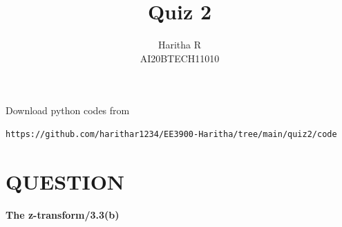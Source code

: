 \documentclass[journal,12pt,twocolumn]{IEEEtran}
\begin{document}
     \def\centbox#1{\makebox[0in]{#1}}
     \def\topbox#1{\raisebox{-\baselineskip}[0in][0in]{#1}}
     \def\midbox#1{\raisebox{-0.5\baselineskip}[0in][0in]{#1}}
\vspace{3cm}
\title{Quiz 2}
\author{Haritha R \\ AI20BTECH11010}
\maketitle
\newpage
\bigskip
\renewcommand{\thefigure}{\theenumi}
\renewcommand{\thetable}{\theenumi}
Download python codes from
%
\begin{lstlisting}
https://github.com/harithar1234/EE3900-Haritha/tree/main/quiz2/code
\end{lstlisting}
%

\section*{QUESTION}
\textbf{The z-transform/3.3(b)}
\end{document}
